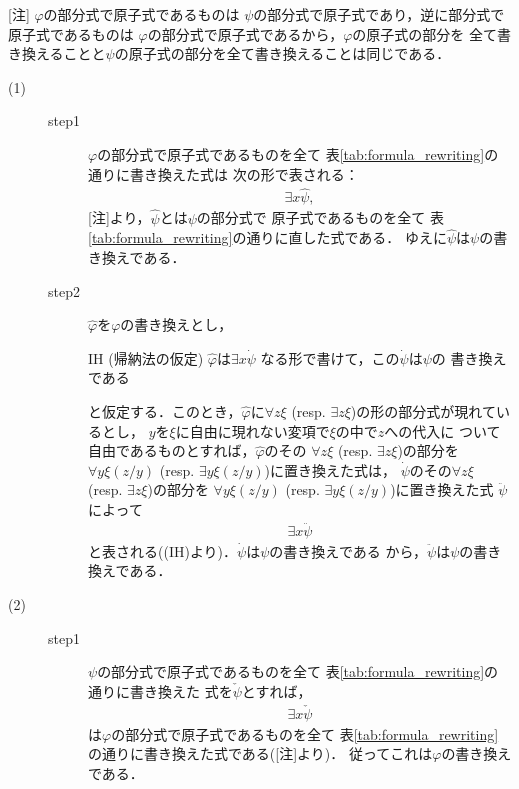 	\begin{metaprf}\mbox{}
		[注] $\varphi$の部分式で原子式であるものは
		$\psi$の部分式で原子式であり，逆に部分式で原子式であるものは
		$\varphi$の部分式で原子式であるから，$\varphi$の原子式の部分を
		全て書き換えることと$\psi$の原子式の部分を全て書き換えることは同じである．
		\begin{description}
			\item[(1)] 
				\begin{description}
					\item[step1]
						$\varphi$の部分式で原子式であるものを全て
						表\ref{tab:formula_rewriting}の通りに書き換えた式は
						次の形で表される：
						\begin{align}
							\exists x \hat{\psi},
						\end{align}
						[注]より，$\hat{\psi}$とは$\psi$の部分式で
						原子式であるものを全て
						表\ref{tab:formula_rewriting}の通りに直した式である．
						ゆえに$\hat{\psi}$は$\psi$の書き換えである．
						
					\item[step2]
						$\widehat{\varphi}$を$\varphi$の書き換えとし，
						\begin{itembox}[l]{IH (帰納法の仮定)}
							$\widehat{\varphi}$は$\exists x \dot{\psi}$
							なる形で書けて，この$\dot{\psi}$は$\psi$の
							書き換えである
						\end{itembox}
						と仮定する．このとき，$\widehat{\varphi}$に$\forall z \xi$ 
						(resp. $\exists z \xi$)の形の部分式が現れているとし，
						$y$を$\xi$に自由に現れない変項で$\xi$の中で$z$への代入に
						ついて自由であるものとすれば，$\widehat{\varphi}$のその
						$\forall z \xi$ (resp. $\exists z \xi$)の部分を
						$\forall y \xi(z/y)$
						(resp. $\exists y \xi(z/y)$)に置き換えた式は，
						$\dot{\psi}$のその$\forall z \xi$
						(resp. $\exists z \xi$)の部分を
						$\forall y \xi(z/y)$
						(resp. $\exists y \xi(z/y)$)に置き換えた式
						$\ddot{\psi}$によって
						\begin{align}
							\exists x \ddot{\psi}
						\end{align}
						と表される((IH)より)．$\dot{\psi}$は$\psi$の書き換えである
						から，$\ddot{\psi}$は$\psi$の書き換えである．
				\end{description}
				
			\item[(2)]		
				\begin{description}
					\item[step1]
						$\psi$の部分式で原子式であるものを全て
						表\ref{tab:formula_rewriting}の通りに書き換えた
						式を$\check{\psi}$とすれば，
						\begin{align}
							\exists x \check{\psi}
						\end{align}
						は$\varphi$の部分式で原子式であるものを全て
						表\ref{tab:formula_rewriting}の通りに書き換えた式である([注]より)．
						従ってこれは$\varphi$の書き換えである．
								

\end{description}
\end{description}
\end{metaprf}
